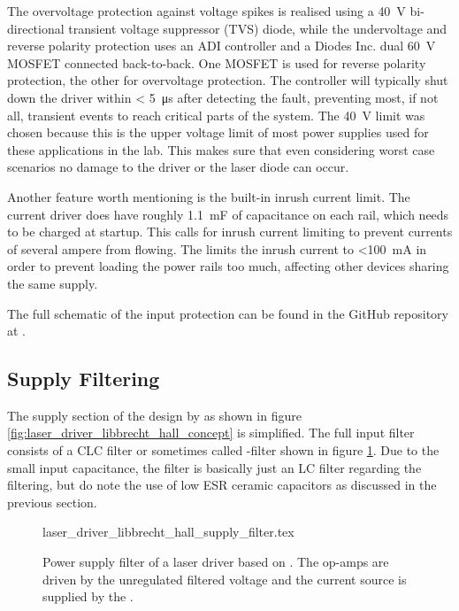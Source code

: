 The overvoltage protection against voltage spikes is realised using a  \cite{datasheet_SMBJ-Q} \qty{40}{\V} bi-directional transient voltage suppressor (TVS) diode, while the undervoltage and reverse polarity protection uses an ADI  \cite{datasheet_LTC4365} controller and a Diodes Inc.  \cite{datasheet_DMN6040SSD} dual \qty{60}{\V} MOSFET connected back-to-back. One MOSFET is used for reverse polarity protection, the other for overvoltage protection. The  controller will typically shut down the driver within \qty{< 5}{\us} after detecting the fault, preventing most, if not all, transient events to reach critical parts of the system. The \qty{40}{\V} limit was chosen because this is the upper voltage limit of most power supplies used for these applications in the lab. This makes sure that even considering worst case scenarios no damage to the driver or the laser diode can occur.

Another feature worth mentioning is the built-in inrush current limit. The current driver does have roughly \qty{1.1}{\milli\F} of capacitance on each rail, which needs to be charged at startup. This calls for inrush current limiting to prevent currents of several ampere from flowing. The  limits the inrush current to \qty{<100}{\mA} in order to prevent loading the power rails too much, affecting other devices sharing the same supply.

The full schematic of the input protection can be found in the GitHub repository at \cite{git_dgDrive}.

\subsection{Supply Filtering}
\label{sec:supply_filtering}
The supply section of the design by \citeauthor{libbrecht_hall} \cite{libbrecht_hall} as shown in figure \ref{fig:laser_driver_libbrecht_hall_concept} is simplified. The full input filter consists of a CLC filter or sometimes called \pi-filter shown in figure \ref{fig:laser_driver_libbrecht_hall_filter}. Due to the small input capacitance, the filter is basically just an LC filter regarding the filtering, but do note the use of low ESR ceramic capacitors as discussed in the previous section.
\begin{figure}[ht]
    \centering
        {laser_driver_libbrecht_hall_supply_filter.tex}
    \caption{Power supply filter of a laser driver based on \cite{libbrecht_hall}. The op-amps are driven by the unregulated filtered voltage and the current source is supplied by the .}
    \label{fig:laser_driver_libbrecht_hall_filter}
\end{figure}

